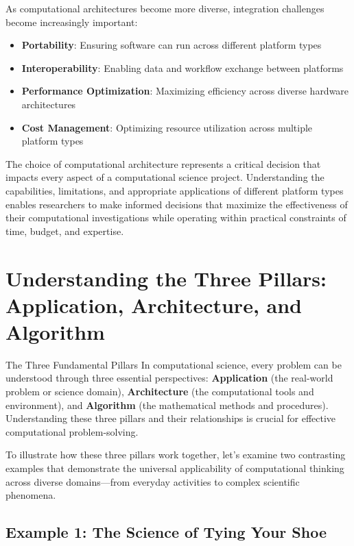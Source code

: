 As computational architectures become more diverse, integration challenges become increasingly important:

\begin{itemize}
    \item \textbf{Portability}: Ensuring software can run across different platform types
    \item \textbf{Interoperability}: Enabling data and workflow exchange between platforms
    \item \textbf{Performance Optimization}: Maximizing efficiency across diverse hardware architectures
    \item \textbf{Cost Management}: Optimizing resource utilization across multiple platform types
\end{itemize}

The choice of computational architecture represents a critical decision that impacts every aspect of a computational science project. Understanding the capabilities, limitations, and appropriate applications of different platform types enables researchers to make informed decisions that maximize the effectiveness of their computational investigations while operating within practical constraints of time, budget, and expertise.

\section{Understanding the Three Pillars: Application, Architecture, and Algorithm}

\begin{conceptcard}{The Three Fundamental Pillars}
In computational science, every problem can be understood through three essential perspectives: \textbf{Application} (the real-world problem or science domain), \textbf{Architecture} (the computational tools and environment), and \textbf{Algorithm} (the mathematical methods and procedures). Understanding these three pillars and their relationships is crucial for effective computational problem-solving.
\end{conceptcard}

To illustrate how these three pillars work together, let's examine two contrasting examples that demonstrate the universal applicability of computational thinking across diverse domains—from everyday activities to complex scientific phenomena.

\subsection{Example 1: The Science of Tying Your Shoe}


